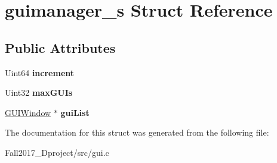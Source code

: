 \hypertarget{structguimanager__s}{}\section{guimanager\+\_\+s Struct Reference}
\label{structguimanager__s}
\subsection*{Public Attributes}
\begin{DoxyCompactItemize}
\item 
\mbox{\label{structguimanager__s_a570260cbf6c37767cefc13a181080d0d}} 
Uint64 {\bfseries increment}
\item 
\mbox{\label{structguimanager__s_a5c89a0559baf901b0fb83069401301ef}} 
Uint32 {\bfseries max\+G\+U\+Is}
\item 
\mbox{\label{structguimanager__s_a3be2ac218b202c1c371e4af4ef002847}} 
\hyperlink{structguiwindow__s}{G\+U\+I\+Window} $\ast$ {\bfseries gui\+List}
\end{DoxyCompactItemize}


The documentation for this struct was generated from the following file\+:\begin{DoxyCompactItemize}
\item 
Fall2017\+\_\+Dproject/src/gui.\+c\end{DoxyCompactItemize}
